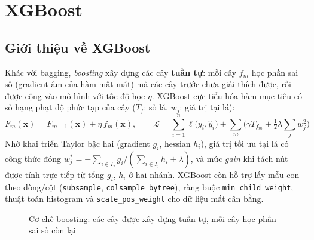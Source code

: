 \section{XGBoost}\label{sec:xgb}

\subsection{Giới thiệu về XGBoost}
Khác với bagging, \textit{boosting} xây dựng các cây \textbf{tuần tự}: mỗi cây $f_m$ học phần sai số (gradient âm của hàm mất mát) mà các cây trước chưa giải thích được, rồi được cộng vào mô hình với tốc độ học $\eta$. XGBoost \cite{chen2016} cực tiểu hóa hàm mục tiêu có số hạng phạt độ phức tạp của cây ($T_f$: số lá, $w_j$: giá trị tại lá):
\begin{equation}
    F_m(\mathbf{x}) = F_{m-1}(\mathbf{x}) + \eta \, f_m(\mathbf{x}), \qquad
    \mathcal{L} = \sum_{i=1}^{n} \ell\big(y_i, \hat{y}_i\big) + \sum_{m} \Big(\gamma T_{f_m} + \tfrac{1}{2}\lambda \sum_{j} w_j^2\Big)
\end{equation}
Nhờ khai triển Taylor bậc hai (gradient $g_i$, hessian $h_i$), giá trị tối ưu tại lá có công thức đóng $w_j^{*} = -\sum_{i \in I_j} g_i / (\sum_{i \in I_j} h_i + \lambda)$, và mức \textit{gain} khi tách nút được tính trực tiếp từ tổng $g_i$, $h_i$ ở hai nhánh. XGBoost còn hỗ trợ lấy mẫu con theo dòng/cột (\texttt{subsample}, \texttt{colsample\_bytree}), ràng buộc \texttt{min\_child\_weight}, thuật toán histogram và \texttt{scale\_pos\_weight} cho dữ liệu mất cân bằng.

\begin{figure}[H]
\centering
{}
\caption{Cơ chế boosting: các cây được xây dựng tuần tự, mỗi cây học phần sai số còn lại}
\end{figure}

